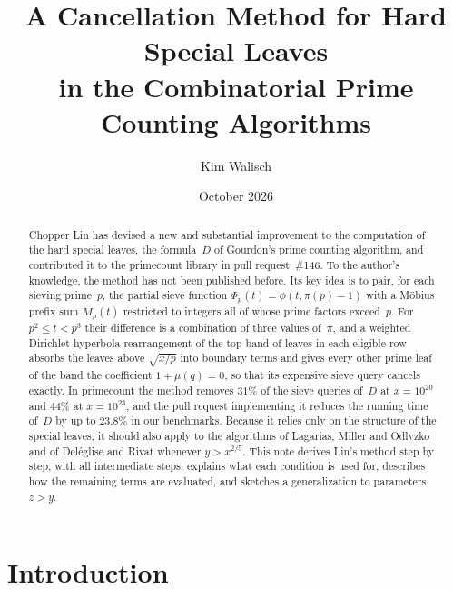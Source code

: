 \documentclass[11pt,a4paper]{amsart}
\numberwithin{equation}{section}
\begin{document}
\title[A cancellation method for hard special leaves]{A Cancellation Method for Hard Special Leaves\\ in the Combinatorial Prime Counting Algorithms}
\author{Kim Walisch}
\date{October 2026}

\begin{abstract}
Chopper Lin has devised a new and substantial
improvement to the computation of the hard special leaves, the formula~$D$ of
Gourdon's prime counting algorithm, and contributed it to the primecount
library in pull request~\#146. To the author's knowledge, the method has not
been published before. Its key idea is to pair, for each sieving prime~$p$, the
partial sieve function $\Phi_p(t)=\phi(t,\pi(p)-1)$ with a M\"obius prefix sum
$M_p(t)$ restricted to integers all of whose prime factors exceed~$p$. For
$p^2\le t<p^3$ their difference is a combination of three values of~$\pi$, and
a weighted Dirichlet hyperbola rearrangement of the top band of leaves in each
eligible row absorbs the leaves above $\sqrt{x/p}$ into boundary terms and gives
every other prime leaf of the band the coefficient $1+\mu(q)=0$, so that its
expensive sieve query cancels exactly. In primecount the method removes $31\%$
of the sieve queries of~$D$ at $x=10^{20}$ and $44\%$ at $x=10^{23}$, and the
pull request implementing it reduces the running time of~$D$ by up to $23.8\%$ in our benchmarks. Because it
relies only on the structure of the special leaves, it should also apply to the
algorithms of Lagarias, Miller and Odlyzko and of Del\'eglise and Rivat whenever
$y>x^{2/5}$. This note derives Lin's method step by step, with all intermediate steps,
explains what each condition is used for, describes how the remaining terms
are evaluated, and sketches a generalization to parameters $z>y$.
\end{abstract}

\maketitle

\section{Introduction}\label{sec:intro}
\end{document}

